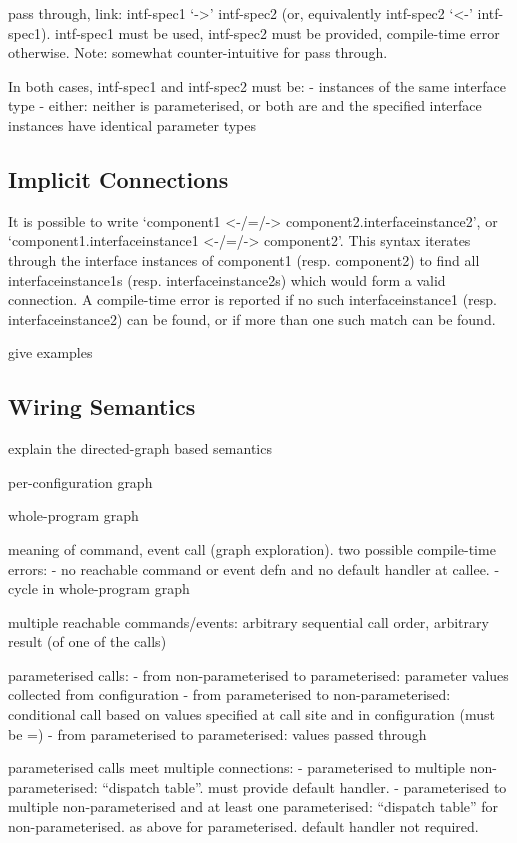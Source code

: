 \documentclass[11pt]{article}
\begin{document}
pass through, link: intf-spec1 `->' intf-spec2 (or, equivalently
intf-spec2 `<-' intf-spec1). intf-spec1 must be used, intf-spec2
must be provided, compile-time error otherwise. Note: somewhat
counter-intuitive for pass through.

In both cases, intf-spec1 and intf-spec2 must be:
- instances of the same interface type
- either: neither is parameterised, or both are and the specified interface
instances have identical parameter types

\subsection{Implicit Connections}

It is possible to write `component1 <-/=/-> component2.interfaceinstance2',
or `component1.interfaceinstance1 <-/=/-> component2'. This syntax iterates
through the interface instances of component1 (resp. component2) to find
all interfaceinstance1s (resp. interfaceinstance2s) which would form a
valid connection. A compile-time error is reported if no such
interfaceinstance1 (resp. interfaceinstance2) can be found, or if more
than one such match can be found.

give examples

\subsection{Wiring Semantics}

explain the directed-graph based semantics

per-configuration graph

whole-program graph

meaning of command, event call (graph exploration). two possible
compile-time errors: 
- no reachable command or event defn and no default handler at callee.
- cycle in whole-program graph

multiple reachable commands/events: arbitrary sequential call order,
arbitrary result (of one of the calls) 

parameterised calls:
- from non-parameterised to parameterised: parameter values collected
from configuration
- from parameterised to non-parameterised: conditional call based on
values specified at call site and in configuration (must be =)
- from parameterised to parameterised: values passed through

parameterised calls meet multiple connections:
- parameterised to multiple non-parameterised: ``dispatch table''. must
provide default handler.
- parameterised to multiple non-parameterised and at least one
parameterised: ``dispatch table'' for non-parameterised. as above
for parameterised. default handler not required.
\end{document}
